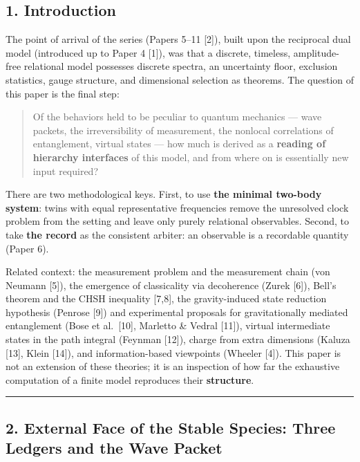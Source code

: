 \documentclass[
]{article}
\begin{document}
\subsection{1. Introduction}\label{introduction}

The point of arrival of the series (Papers 5--11 {[}2{]}), built upon
the reciprocal dual model (introduced up to Paper 4 {[}1{]}), was that a
discrete, timeless, amplitude-free relational model possesses discrete
spectra, an uncertainty floor, exclusion statistics, gauge structure,
and dimensional selection as theorems. The question of this paper is the
final step:

\begin{quote}
Of the behaviors held to be peculiar to quantum mechanics --- wave
packets, the irreversibility of measurement, the nonlocal correlations
of entanglement, virtual states --- how much is derived as a
\textbf{reading of hierarchy interfaces} of this model, and from where
on is essentially new input required?
\end{quote}

There are two methodological keys. First, to use \textbf{the minimal
two-body system}: twins with equal representative frequencies remove the
unresolved clock problem from the setting and leave only purely
relational observables. Second, to take \textbf{the record} as the
consistent arbiter: an observable is a recordable quantity (Paper 6).

Related context: the measurement problem and the measurement chain (von
Neumann {[}5{]}), the emergence of classicality via decoherence (Zurek
{[}6{]}), Bell's theorem and the CHSH inequality {[}7,8{]}, the
gravity-induced state reduction hypothesis (Penrose {[}9{]}) and
experimental proposals for gravitationally mediated entanglement (Bose
et al.~{[}10{]}, Marletto \& Vedral {[}11{]}), virtual intermediate
states in the path integral (Feynman {[}12{]}), charge from extra
dimensions (Kaluza {[}13{]}, Klein {[}14{]}), and information-based
viewpoints (Wheeler {[}4{]}). This paper is not an extension of these
theories; it is an inspection of how far the exhaustive computation of a
finite model reproduces their \textbf{structure}.

\begin{center}\rule{0.5\linewidth}{0.5pt}\end{center}

\subsection{2. External Face of the Stable Species: Three Ledgers and
the Wave
Packet}\label{external-face-of-the-stable-species-three-ledgers-and-the-wave-packet}
\end{document}
